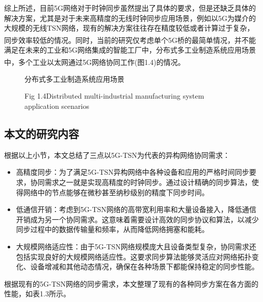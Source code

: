 \documentclass[UTF8,a4paper,12pt]{ctexart}
\numberwithin{equation}{section}
\begin{document}
	综上所述，目前5G网络对于时钟同步虽然提出了具体的要求，但是还缺乏具体的解决方案，尤其是对于未来高精度的无线时钟同步应用场景，例如以5G为媒介的大规模的无线TSN网络，现有的解决方案往往存在精度较低或者计算过于复杂，同步效率较低的情况。同时，当前的研究仅考虑单个5G桥的最简单情况\textsuperscript{\cite{9557468}}，并不能满足在未来的工业和5G网络集成的智能工厂中，分布式多工业制造系统应用场景中，多个工业以太网通过5G网络协同工作(图1.4)的情况\textsuperscript{\cite{8402373}}。
	\begin{figure}[htb] 
		\caption{分布式多工业制造系统应用场景}
		\vspace{-10pt}
		\caption*{Fig 1.4\quad Distributed multi-industrial manufacturing system application scenarios}
	\end{figure}
	
	\subsection{本文的研究内容}
	根据以上小节，本文总结了三点以5G-TSN为代表的异构网络协同需求：
	\begin{itemize}
		\item  高精度同步：为了满足5G-TSN异构网络中各种设备和应用的严格时间同步要求，协同需求之一就是实现高精度的时钟同步。通过设计精确的同步算法，使得网络中的节点能够在微秒甚至纳秒级别的精度下同步时间。
		\item 低通信开销：考虑到5G-TSN网络的高带宽利用率和大量设备接入，降低通信开销成为另一个协同需求。这意味着需要设计高效的同步协议和算法，以减少同步过程中的数据传输量和频率，从而降低网络拥塞和能耗。
		\item 大规模网络适应性：由于5G-TSN网络规模庞大且设备类型复杂，协同需求还包括实现良好的大规模网络适应性。这要求同步算法能够灵活应对网络拓扑变化、设备增减和其他动态情况，确保在各种场景下都能保持稳定的同步性能。
	\end{itemize}
	根据现有的5G-TSN网络的同步需求，本文整理了现有的各种同步方案在各方面的性能，如表1.3所示。
	
\end{document}
